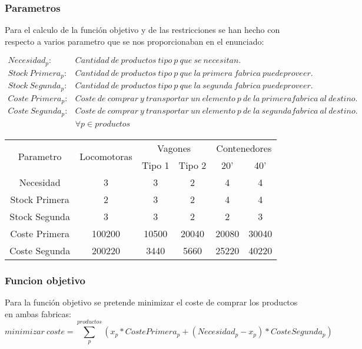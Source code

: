\documentclass[11pt,spanish]{article}
\begin{document}
			\subsubsection{Parametros}
			Para el calculo de la función objetivo y de las restricciones se han hecho con respecto a varios parametro que se nos proporcionaban en el enunciado:
			
			\begin{align*}
			Necesidad_p:& Cantidad\ de\ productos\ tipo\ p\ que\ se\ necesitan. \\
			Stock\ Primera_p:& Cantidad\ de\ productos\ tipo\ p\ que\ la\ primera\ fabrica\ puede proveer. \\
			Stock\ Segunda_p:& Cantidad\ de\ productos\ tipo\ p\ que\ la\ segunda\ fabrica\ puede proveer. \\
			Coste\ Primera_p:& Coste\ de\ comprar\ y\ transportar\ un\ elemento\ p\ de\ la\ primera fabrica\ al\ destino. \\
			Coste\ Segunda_p:& Coste\ de\ comprar\ y\ transportar\ un\ elemento\ p\ de\ la\ segunda fabrica\ al\ destino. \\
			&\forall p \in productos 
			\end{align*}
			\begin{tabular}{ |c||c|c|c|c|c|  }
			 \hline
			 \multirow{2}{*}{Parametro} & \multirow{2}{*}{Locomotoras} &  \multicolumn{2}{|c|}{Vagones} & \multicolumn{2}{|c|}{Contenedores} \\
			 & & Tipo 1 & Tipo 2 & 20' & 40'\\
			 \hline
			 Necesidad & 3 & 3 & 2 & 4 & 4 \\
			 Stock Primera & 2 & 3 & 2 & 4 & 4 \\
			 Stock Segunda & 3 & 3 & 2 & 2 & 3 \\
 			 Coste Primera & 100200 & 10500 & 20040 & 20080 & 30040 \\
			 Coste Segunda & 200220 & 3440 & 5660 & 25220 & 40220 \\
			 \hline
			\end{tabular}

			\subsubsection{Funcion objetivo}
			Para la función objetivo se pretende minimizar el coste de comprar los productos en ambas fabricas:
			$$
			minimizar\ coste = \sum_p^{productos} (x_p * Coste Primera_p + (Necesidad_p - x_p) * Coste Segunda_p)
			$$
\end{document}
